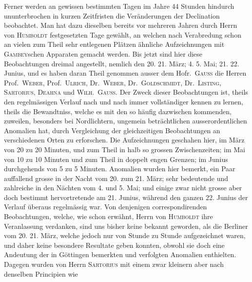 Ferner werden an gewissen bestimmten Tagen im Jahre 44 Stunden hindurch ununterbrochen in kurzen Zeitfristen die Veränderungen der Declination beobachtet. Man hat dazu dieselben bereits vor mehreren Jahren durch Herrn von \textsc{Humboldt} festgesetzten Tage gewählt, an welchen nach Verabredung schon an vielen zum Theil sehr entlegenen Plätzen ähnliche Aufzeichnungen mit \textsc{Gambey}schen Apparaten gemacht werden. Bis jetzt sind hier diese Beobachtungen dreimal angestellt, nemlich den 20. 21. März; 4. 5. Mai; 21. 22. Junius, und es haben daran Theil genommen ausser dem Hofr.\ \textsc{Gauss} die Herren Prof.\ \textsc{Weber}, Prof.\ \textsc{Ulrich}, Dr.\ \textsc{Weber}, Dr.\ \textsc{Goldschmidt}, Dr.\ \textsc{Listing}, \textsc{Sartorius}, \textsc{Deahna} und \textsc{Wilh.\ Gauss}. Der Zweck dieser Beobachtungen ist, theils den regelmässigen Verlauf nach und nach immer vollständiger kennen zu lernen, theils die Bewandtniss, welche es mit den so häufig dazwischen kommenden, zuweilen, besonders bei Nordlichtern, ungemein beträchtlichen ausserordentlichen Anomalien hat, durch Vergleichung der gleichzeitigen Beobachtungen an verschiedenen Orten zu erforschen. Die Aufzeichnungen geschahen hier, im März von 20 zu 20 Minuten, und zum Theil in halb so grossen Zwischenzeiten; im Mai von 10 zu 10 Minuten und zum Theil in doppelt engen Grenzen; im Junius durchgehends von 5 zu 5 Minuten. Anomalien wurden hier bemerkt, ein Paar auffallend grosse in der Nacht vom 20. zum 21. März; sehr bedeutende und zahlreiche in den Nächten vom 4. und 5. Mai; und einige zwar nicht grosse aber doch bestimmt hervortretende am 21. Junius, während den ganzen 22. Junius der Verlauf überaus regelmässig war. Von denjenigen correspondirenden Beobachtungen, welche, wie schon erwähnt, Herrn von \textsc{Humboldt} ihre Veranlassung verdanken, sind uns bisher keine bekannt geworden, als die Berliner vom 20. 21. März, welche jedoch nur von Stunde zu Stunde aufgezeichnet waren, und daher keine besondere Resultate geben konnten, obwohl sie doch eine Andeutung der in Göttingen bemerkten und verfolgten Anomalien enthielten. Dagegen wurden von Herrn \textsc{Sartorius} mit einem zwar kleinern aber nach denselben Principien wie
